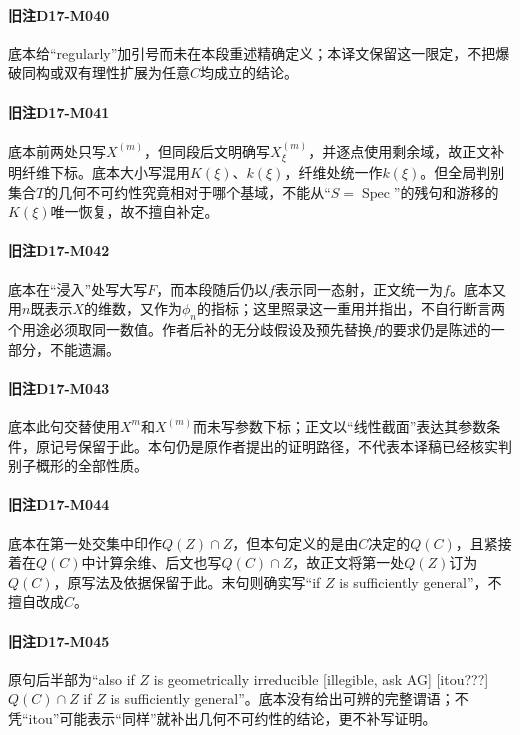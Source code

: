 \documentclass[UTF8,a4paper]{ctexbook}
\begin{document}
\paragraph*{旧注D17-M040}
底本给“regularly”加引号而未在本段重述精确定义；本译文保留这一限定，不把爆破同构或双有理性扩展为任意$C$均成立的结论。

\paragraph*{旧注D17-M041}
底本前两处只写$X^{(m)}$，但同段后文明确写$X_\xi^{(m)}$，并逐点使用剩余域，故正文补明纤维下标。底本大小写混用$K(\xi)$、$k(\xi)$，纤维处统一作$k(\xi)$。但全局判别集合$T$的几何不可约性究竟相对于哪个基域，不能从“$S=\operatorname{Spec}$”的残句和游移的$K(\xi)$唯一恢复，故不擅自补定。

\paragraph*{旧注D17-M042}
底本在“浸入”处写大写$F$，而本段随后仍以$f$表示同一态射，正文统一为$f$。底本又用$n$既表示$X$的维数，又作为$\phi_n$的指标；这里照录这一重用并指出，不自行断言两个用途必须取同一数值。作者后补的无分歧假设及预先替换$f$的要求仍是陈述的一部分，不能遗漏。

\paragraph*{旧注D17-M043}
底本此句交替使用$X^m$和$X^{(m)}$而未写参数下标；正文以“线性截面”表达其参数条件，原记号保留于此。本句仍是原作者提出的证明路径，不代表本译稿已经核实判别子概形的全部性质。

\paragraph*{旧注D17-M044}
底本在第一处交集中印作$Q(Z)\cap Z$，但本句定义的是由$C$决定的$Q(C)$，且紧接着在$Q(C)$中计算余维、后文也写$Q(C)\cap Z$，故正文将第一处$Q(Z)$订为$Q(C)$，原写法及依据保留于此。末句则确实写“if $Z$ is sufficiently general”，不擅自改成$C$。

\paragraph*{旧注D17-M045}
原句后半部为“also if $Z$ is geometrically irreducible [illegible, ask AG] [itou???] $Q(C)\cap Z$ if $Z$ is sufficiently general”。底本没有给出可辨的完整谓语；不凭“itou”可能表示“同样”就补出几何不可约性的结论，更不补写证明。
\setcounter{secnumdepth}{-2}
\end{document}
